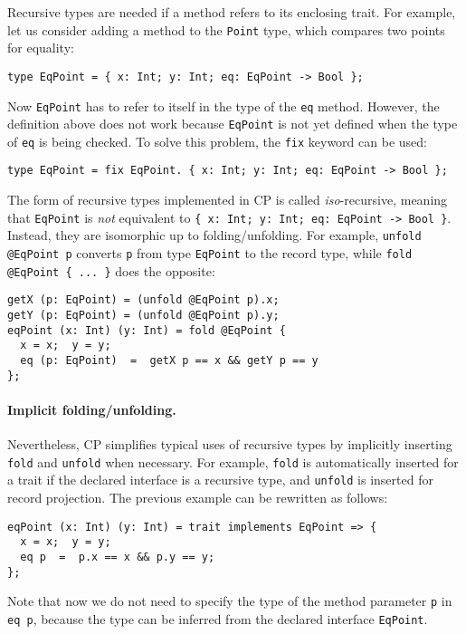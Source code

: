 Recursive types are needed if a method refers to its enclosing trait. For
example, let us consider adding a method to the \lstinline{Point} type, which
compares two points for equality:
\begin{lstlisting}
type EqPoint = { x: Int; y: Int; eq: EqPoint -> Bool };
\end{lstlisting}
Now \lstinline{EqPoint} has to refer to itself in the type of the \lstinline{eq}
method. However, the definition above does not work because \lstinline{EqPoint} is
not yet defined when the type of \lstinline{eq} is being checked. To solve this
problem, the \lstinline{fix} keyword can be used:
\begin{lstlisting}
type EqPoint = fix EqPoint. { x: Int; y: Int; eq: EqPoint -> Bool };
\end{lstlisting}
The form of recursive types implemented in CP is called \emph{iso}-recursive,
meaning that \lstinline{EqPoint} is \emph{not} equivalent to
\lstinline|{ x: Int; y: Int; eq: EqPoint -> Bool }|. Instead, they are isomorphic
up to folding/unfolding. For example, \lstinline{unfold @EqPoint p} converts
\lstinline{p} from type \lstinline{EqPoint} to the record type, while
\lstinline|fold @EqPoint { ... }| does the opposite:
\begin{lstlisting}
getX (p: EqPoint) = (unfold @EqPoint p).x;
getY (p: EqPoint) = (unfold @EqPoint p).y;
eqPoint (x: Int) (y: Int) = fold @EqPoint {
  x = x;  y = y;
  eq (p: EqPoint)  =  getX p == x && getY p == y
};
\end{lstlisting}

\paragraph{Implicit folding/unfolding.}
Nevertheless, CP simplifies typical uses of recursive types by implicitly
inserting \lstinline{fold} and \lstinline{unfold} when necessary. For example,
\lstinline{fold} is automatically inserted for a trait if the declared interface
is a recursive type, and \lstinline{unfold} is inserted for record projection.
The previous example can be rewritten as follows:
\begin{lstlisting}
eqPoint (x: Int) (y: Int) = trait implements EqPoint => {
  x = x;  y = y;
  eq p  =  p.x == x && p.y == y;
};
\end{lstlisting}
Note that now we do not need to specify the type of the method parameter
\lstinline{p} in \lstinline{eq p}, because the type can be inferred from the
declared interface \lstinline{EqPoint}.

